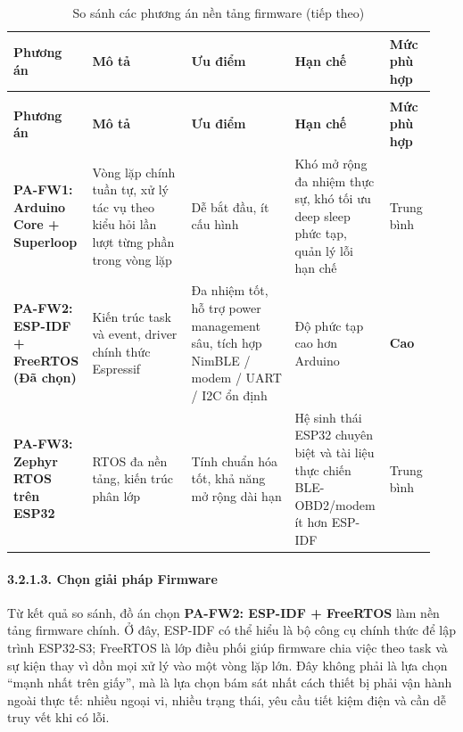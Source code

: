 \documentclass[a4paper]{extarticle}
\newcommand{\thesissettableid}[2]{%
  \renewcommand{\thetable}{#1}%
  \renewcommand{\theHtable}{#2}%
}
\begin{document}
{\thesissettableid{3.5A}{tab-ch3-so-sanh-cac-phuong-an-nen-tang-firmware}
\def\LTcaptype{table}
\begin{longtable}{|L{0.138\linewidth}|L{0.236\linewidth}|L{0.246\linewidth}|L{0.224\linewidth}|L{0.100\linewidth}|}
\caption{So sánh các phương án nền tảng firmware}\label{tab:ch3-so-sanh-cac-phuong-an-nen-tang-firmware}\\
\hline \textbf{Phương án} & \textbf{Mô tả} & \textbf{Ưu điểm} & \textbf{Hạn chế} & \textbf{Mức phù hợp} \\
\hline
\endfirsthead
\caption[]{So sánh các phương án nền tảng firmware (tiếp theo)}\\
\hline \textbf{Phương án} & \textbf{Mô tả} & \textbf{Ưu điểm} & \textbf{Hạn chế} & \textbf{Mức phù hợp} \\
\hline
\endhead
\hline
\endfoot
\endlastfoot
\textbf{PA-FW1: Arduino Core + Superloop} & Vòng lặp chính tuần tự, xử
lý tác vụ theo kiểu hỏi lần lượt từng phần trong vòng lặp & Dễ bắt đầu, ít cấu hình & Khó mở rộng đa nhiệm
thực sự, khó tối ưu deep sleep phức tạp, quản lý lỗi hạn chế & Trung
bình \\\hline
\textbf{PA-FW2: ESP-IDF + FreeRTOS (Đã chọn)} & Kiến trúc task và event,
driver chính thức Espressif & Đa nhiệm tốt, hỗ trợ power management sâu,
tích hợp NimBLE / modem / UART / I2C ổn định & Độ phức tạp cao hơn Arduino &
\textbf{Cao} \\\hline
\textbf{PA-FW3: Zephyr RTOS trên ESP32} & RTOS đa nền tảng, kiến trúc
phân lớp & Tính chuẩn hóa tốt, khả năng mở rộng dài hạn & Hệ sinh thái
ESP32 chuyên biệt và tài liệu thực chiến BLE-OBD2/modem ít hơn ESP-IDF &
Trung bình \\\hline
\end{longtable}
}


\paragraph{3.2.1.3. Chọn giải pháp
Firmware}\label{3123-chux1ecdn-giux1ea3i-phuxe1p-firmware}

Từ kết quả so sánh, đồ án chọn \textbf{PA-FW2: ESP-IDF + FreeRTOS} làm
nền tảng firmware chính. Ở đây, ESP-IDF có thể hiểu là bộ công cụ chính
thức để lập trình ESP32-S3; FreeRTOS là lớp điều phối giúp firmware chia
việc theo task và sự kiện thay vì dồn mọi xử lý vào một vòng lặp lớn.
Đây không phải là lựa chọn ``mạnh nhất trên giấy'', mà là lựa chọn bám
sát nhất cách thiết bị phải vận hành ngoài thực tế: nhiều ngoại vi,
nhiều trạng thái, yêu cầu tiết kiệm điện và cần dễ truy vết khi có lỗi.
\end{document}
